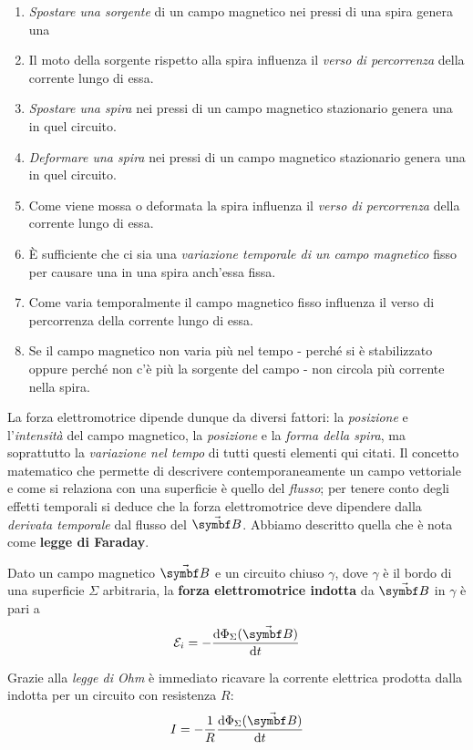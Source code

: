 \begin{enumerate}[label=\alph*)]\label{osservazioniFaraday} %
	\item \textit{Spostare una sorgente} di un campo magnetico nei pressi di una spira genera una \fem
	\item Il moto della sorgente rispetto alla spira influenza il \textit{verso di percorrenza} della corrente lungo di essa.
	\item \textit{Spostare una spira} nei pressi di un campo magnetico stazionario genera una \fem in quel circuito.
	\item \textit{Deformare una spira} nei pressi di un campo magnetico stazionario genera una \fem in quel circuito.
	\item Come viene mossa o deformata la spira influenza il \textit{verso di percorrenza} della corrente lungo di essa.
	\item È sufficiente che ci sia una \textit{variazione temporale di un campo magnetico} fisso per causare una \fem in una spira anch'essa fissa.
	\item Come varia temporalmente il campo magnetico fisso influenza il verso di percorrenza della corrente lungo di essa.
	\item Se il campo magnetico non varia più nel tempo - perché si è stabilizzato oppure perché non c'è più la sorgente del campo - non circola più corrente nella spira.
\end{enumerate}
La forza elettromotrice dipende dunque da diversi fattori: la \textit{posizione} e l'\textit{intensità} del campo magnetico, la \textit{posizione} e la \textit{forma della spira}, ma soprattutto la \textit{variazione nel tempo} di tutti questi elementi qui citati.
Il concetto matematico che permette di descrivere contemporaneamente un campo vettoriale e come si relaziona con una superficie è quello del \textit{flusso}; per tenere conto degli effetti temporali si deduce che la forza elettromotrice deve dipendere dalla \textit{derivata temporale} dal flusso del $\vba{B}$. Abbiamo descritto quella che è nota come \textbf{legge di Faraday}.
\begin{theorema}
	Dato un campo magnetico $\vba{B}$ e un circuito chiuso $\gamma$, dove $\gamma$ è il bordo di una superficie $\Sigma$ arbitraria, la \textbf{forza elettromotrice indotta} da $\vba{B}$ in $\gamma$ è pari a
	\begin{equation}
		\mathcal{E}_i=-\dv{\Phi_\Sigma (\vba B)}{t}
	\end{equation}
\end{theorema}
Grazie alla \textit{legge di Ohm} è immediato ricavare la corrente elettrica prodotta dalla \fem indotta per un circuito con resistenza $R$:
\begin{equation}
	I=-\frac{1}{R}\dv{\Phi_\Sigma(\vba B)}{t}
\end{equation}

